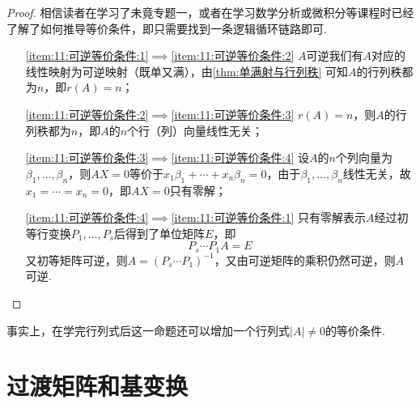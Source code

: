 \begin{proof}
    相信读者在学习了未竟专题一，或者在学习数学分析或微积分等课程时已经了解了如何推导等价条件，即只需要找到一条逻辑循环链路即可.
    \begin{itemize}
        \item[\ref*{item:11:可逆等价条件:1}$\implies$\ref*{item:11:可逆等价条件:2}] $A$可逆我们有$A$对应的线性映射为可逆映射（既单又满），由\autoref{thm:单满射与行列秩} 可知$A$的行列秩都为$n$，即$r(A)=n$；

        \item[\ref*{item:11:可逆等价条件:2}$\implies$\ref*{item:11:可逆等价条件:3}] $r(A)=n$，则$A$的行列秩都为$n$，即$A$的$n$个行（列）向量线性无关；

        \item[\ref*{item:11:可逆等价条件:3}$\implies$\ref*{item:11:可逆等价条件:4}] 设$A$的$n$个列向量为$\beta_1,\ldots,\beta_n$，则$AX=0$等价于$x_1\beta_1+\cdots+x_n\beta_n=0$，由于$\beta_1,\ldots,\beta_n$线性无关，故$x_1=\cdots=x_n=0$，即$AX=0$只有零解；

        \item[\ref*{item:11:可逆等价条件:4}$\implies$\ref*{item:11:可逆等价条件:1}] 只有零解表示$A$经过初等行变换$P_1,\ldots,P_s$后得到了单位矩阵$E$，即
              \[P_s\cdots P_1A=E\]
              又初等矩阵可逆，则$A=(P_s\cdots P_1)^{-1}$，又由可逆矩阵的乘积仍然可逆，则$A$可逆.
    \end{itemize}
\end{proof}

事实上，在学完行列式后这一命题还可以增加一个行列式$|A|\neq 0$的等价条件.

\section{过渡矩阵和基变换}

